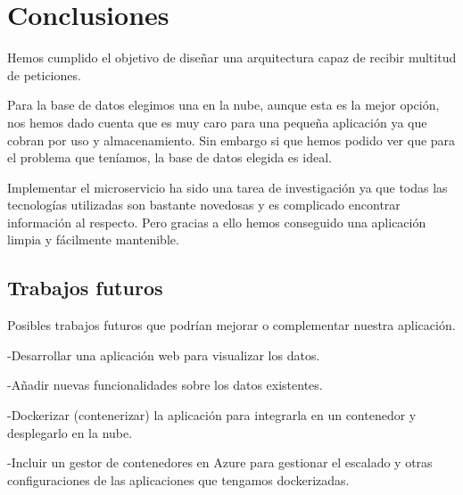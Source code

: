 \documentclass[12pt]{report} %
\begin{document}
\chapter{Conclusiones}

Hemos cumplido el objetivo de diseñar una arquitectura capaz de recibir multitud de peticiones.

Para la base de datos elegimos una en la nube, aunque esta es la mejor opción, nos hemos dado cuenta que es muy caro para una pequeña aplicación ya que cobran por uso y almacenamiento. Sin embargo si que hemos podido ver que para el problema que teníamos, la base de datos elegida es ideal.

Implementar el microservicio ha sido una tarea de investigación ya que todas las tecnologías utilizadas son bastante novedosas y es complicado encontrar información al respecto. Pero gracias a ello hemos conseguido una aplicación limpia y fácilmente mantenible.

\section{Trabajos futuros}

Posibles trabajos futuros que podrían mejorar o complementar nuestra aplicación.

-Desarrollar una aplicación web para visualizar los datos.

-Añadir nuevas funcionalidades sobre los datos existentes.

-Dockerizar (contenerizar) la aplicación para integrarla en un contenedor y desplegarlo en la nube.

-Incluir un gestor de contenedores en Azure para gestionar el escalado y otras configuraciones de las aplicaciones que tengamos dockerizadas.





\clearpage
{}
\printbibliography




\end{document}
